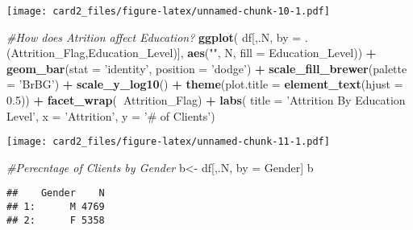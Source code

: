 \documentclass[]{article}
\newenvironment{Shaded}{\begin{snugshade}}{\end{snugshade}}
\newcommand{\CommentTok}[1]{\textcolor[rgb]{0.56,0.35,0.01}{\textit{#1}}}
\newcommand{\DataTypeTok}[1]{\textcolor[rgb]{0.13,0.29,0.53}{#1}}
\newcommand{\FloatTok}[1]{\textcolor[rgb]{0.00,0.00,0.81}{#1}}
\newcommand{\KeywordTok}[1]{\textcolor[rgb]{0.13,0.29,0.53}{\textbf{#1}}}
\newcommand{\NormalTok}[1]{#1}
\newcommand{\OperatorTok}[1]{\textcolor[rgb]{0.81,0.36,0.00}{\textbf{#1}}}
\newcommand{\StringTok}[1]{\textcolor[rgb]{0.31,0.60,0.02}{#1}}
\begin{document}
\texttt{[image: card2\_files/figure-latex/unnamed-chunk-10-1.pdf]}

\begin{Shaded}
\begin{Highlighting}[]
\CommentTok{#How does Atrition affect Education?}
\KeywordTok{ggplot}\NormalTok{( df[,.N, }\DataTypeTok{by =}\NormalTok{ .(Attrition_Flag,Education_Level)], }\KeywordTok{aes}\NormalTok{(}\StringTok{""}\NormalTok{, N, }\DataTypeTok{fill =}\NormalTok{ Education_Level)) }\OperatorTok{+}\StringTok{  }\KeywordTok{geom_bar}\NormalTok{(}\DataTypeTok{stat =} \StringTok{'identity'}\NormalTok{, }\DataTypeTok{position =} \StringTok{'dodge'}\NormalTok{) }\OperatorTok{+}\StringTok{ }\KeywordTok{scale_fill_brewer}\NormalTok{(}\DataTypeTok{palette =} \StringTok{'BrBG'}\NormalTok{) }\OperatorTok{+}\StringTok{ }\KeywordTok{scale_y_log10}\NormalTok{() }\OperatorTok{+}\StringTok{ }\KeywordTok{theme}\NormalTok{(}\DataTypeTok{plot.title =} \KeywordTok{element_text}\NormalTok{(}\DataTypeTok{hjust =} \FloatTok{0.5}\NormalTok{)) }\OperatorTok{+}\StringTok{ }\KeywordTok{facet_wrap}\NormalTok{(}\OperatorTok{~}\NormalTok{Attrition_Flag) }\OperatorTok{+}\StringTok{ }\KeywordTok{labs}\NormalTok{( }\DataTypeTok{title =} \StringTok{'Attrition By Education Level'}\NormalTok{, }\DataTypeTok{x =} \StringTok{'Attrition'}\NormalTok{, }\DataTypeTok{y =} \StringTok{'# of Clients'}\NormalTok{)}
\end{Highlighting}
\end{Shaded}

\texttt{[image: card2\_files/figure-latex/unnamed-chunk-11-1.pdf]}

\begin{Shaded}
\begin{Highlighting}[]
\CommentTok{#Perecntage of Clients by Gender}
\NormalTok{b<-}\StringTok{ }\NormalTok{df[,.N, by =}\StringTok{ }\NormalTok{Gender]}
\NormalTok{b }
\end{Highlighting}
\end{Shaded}

\begin{verbatim}
##    Gender    N
## 1:      M 4769
## 2:      F 5358
\end{verbatim}
\end{document}
